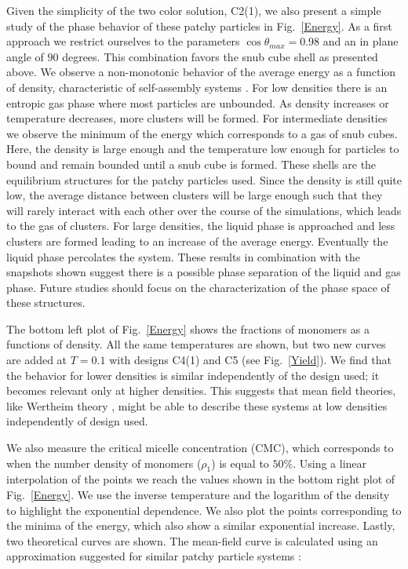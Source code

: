 \documentclass[a4paper, amsfonts, amssymb, amsmath, reprint, showkeys, nofootinbib, twoside]{revtex4-1}
\begin{document}
Given the simplicity of the two color solution, C2(1), we also present a simple study of the phase behavior of these patchy particles in Fig.~\ref{Energy}. As a first approach we restrict ourselves to the parameters $\cos\theta_{max}=0.98$ and an in plane angle of $90$ degrees. This combination favors the snub cube shell as presented above. We observe a non-monotonic behavior of the average energy as a function of density, characteristic of self-assembly systems \cite{Sciortino2009}. For low densities there is an entropic gas phase where most particles are unbounded. As density increases or temperature decreases, more clusters will be formed. For intermediate densities we observe the minimum of the energy which corresponds to a gas of snub cubes. Here, the density is large enough and the temperature low enough for particles to bound and remain bounded until a snub cube is formed. These shells are the equilibrium structures for the patchy particles used. Since the density is still quite low, the average distance between clusters will be large enough such that they will rarely interact with each other over the course of the simulations, which leads to the gas of clusters. For large densities, the liquid phase is approached and less clusters are formed leading to an increase of the average energy. Eventually the liquid phase percolates the system. These results in combination with the snapshots shown suggest there is a possible phase separation of the liquid and gas phase. Future studies should focus on the characterization of the phase space of these structures.

The bottom left plot of Fig.~\ref{Energy} shows the fractions of monomers as a functions of density. All the same temperatures are shown, but two new curves are added at $T=0.1$ with designs C4(1) and C5 (see Fig.~\ref{Yield}). We find that the behavior for lower densities is similar independently of the design used; it becomes relevant only at higher densities. This suggests that mean field theories, like Wertheim theory \cite{Chapman1989}, might be able to describe these systems at low densities independently of design used.

We also measure the critical micelle concentration (CMC), which corresponds to when the number density of monomers ($\rho_1$) is equal to $50\%$. Using a linear interpolation of the points we reach the values shown in the bottom right plot of Fig.~\ref{Energy}. We use the inverse temperature and the logarithm of the density to highlight the exponential dependence. We also plot the points corresponding to the minima of the energy, which also show a similar exponential increase. Lastly, two theoretical curves are shown. The mean-field curve is calculated using an approximation suggested for similar patchy particle systems \cite{Kraft2012}:
\end{document}

